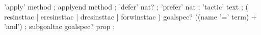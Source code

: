 





\begin{rail}
  'apply' method
  ;
  applyend method
  ;
  'defer' nat?
  ;
  'prefer' nat
  ;
  'tactic' text
  ;
  ( resinsttac | eresinsttac | dresinsttac | forwinsttac ) goalspec? ((name '=' term) + 'and')
  ;
  subgoaltac goalspec? prop
  ;
\end{rail}

